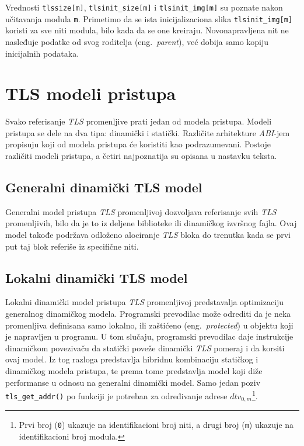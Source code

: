 \documentclass[12pt,oneside]{memoir}
\begin{document}
Vrednosti \texttt{tlssize[m]}, \texttt{tlsinit\_size[m]} i \texttt{tlsinit\_img[m]} su poznate nakon učitavanja modula \texttt{m}. Primetimo da se ista inicijalizaciona slika \texttt{tlsinit\_img[m]} koristi za sve niti modula, bilo kada da se one kreiraju. Novonapravljena nit ne nasleđuje podatke od svog roditelja (eng.~\emph{parent}), već dobija samo kopiju inicijalnih podataka.

\section{TLS modeli pristupa}
\label{sec:tlsmodeli}

Svako referisanje \emph{TLS} promenljive prati jedan od modela pristupa. Modeli pristupa se dele na dva tipa: dinamički i statički. Različite arhitekture \emph{ABI}-jem propisuju koji od modela pristupa će koristiti kao podrazumevani. Postoje različiti modeli pristupa, a četiri najpoznatija su opisana u nastavku teksta.

\subsection{Generalni dinamički TLS model}

Generalni model pristupa \emph{TLS} promenljivoj dozvoljava referisanje svih \emph{TLS} promenljivih, bilo da je to iz deljene biblioteke ili dinamičkog izvršnog fajla. Ovaj model takođe podržava odloženo alociranje \emph{TLS} bloka do trenutka kada se prvi put taj blok referiše iz specifične niti.

\subsection{Lokalni dinamički TLS model}

Lokalni dinamički model pristupa \emph{TLS} promenljivoj predstavalja optimizaciju generalnog dinamičkog modela. Programski prevodilac može odrediti da je neka promenljiva definisana samo lokalno, ili zaštićeno (eng.~\emph{protected}) u objektu koji je napravljen u programu. U tom slučaju, programski prevodilac daje instrukcije dinamičkom povezivaču da statički poveže dinamički \emph{TLS} pomeraj i da korsiti ovaj model. Iz tog razloga predstavlja hibridnu kombinaciju statičkog i dinamičkog modela pristupa, te prema tome predstavlja model koji diže performanse u odnosu na generalni dinamički model. Samo jedan poziv \texttt{tls\_get\_addr()} po funkciji je potreban za određivanje adrese \texttt{$dtv_{0,m}$}\footnote{Prvi broj (\texttt{0}) ukazuje na identifikacioni broj niti, a drugi broj (\texttt{m}) ukazuje na identifikacioni broj modula.}.
\end{document}
